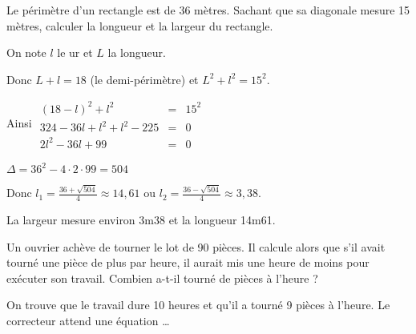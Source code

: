 \begin{exo}
Le périmètre d'un rectangle est de 36 mètres. Sachant que sa diagonale mesure 15 mètres, calculer la longueur et la largeur du rectangle.

\begin{sol*}
On note $l$ le ur et $L$ la longueur. 

Donc $L+l=18$ (le demi-périmètre) et $L^2+l^2=15^2$.

Ainsi 
$
\begin{array}{rcl}
(18-l)^2+l^2 & = & 15 ^2 \\
324-36l+l^2+l^2-225 & = & 0 \\
2l^2-36l+99 & = & 0
\end{array}
$

$\Delta = 36^2-4 \cdot 2 \cdot 99 = 504$

Donc $l_1 = \frac{36+\sqrt{504}}{4} \approx  14,61$ ou $l_2 = \frac{36-\sqrt{504}}{4} \approx 3,38$.

La largeur mesure environ 3m38 et la longueur 14m61.

\end{sol*}
\end{exo}



\begin{exo}
	Un ouvrier achève de tourner le lot de 90 pièces. Il calcule alors que s'il avait tourné une pièce de plus par heure, il aurait mis une heure de moins pour exécuter son travail. Combien a-t-il tourné de pièces à l'heure ?

\begin{sol*}
On trouve que le travail dure 10 heures et qu'il a tourné 9 pièces à l'heure. Le correcteur attend une équation \ldots
\end{sol*}	

\end{exo}

